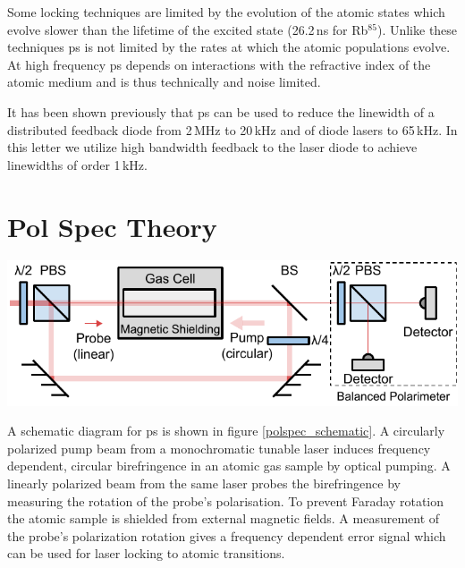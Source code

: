 \documentclass{article}
\newenvironment{Figure}
  {\par\medskip\noindent\minipage{\linewidth}}
  {\endminipage\par\medskip}
\begin{document}
\begin{multicols}{2}
Some locking techniques are limited by the evolution of the atomic states which evolve slower than the lifetime of the excited state (26.2\,ns for Rb$^{85}$). Unlike these techniques \gls*{ps} is not limited by the rates at which the atomic populations evolve. At high frequency \Gls*{ps} depends on interactions with the refractive index of the atomic medium and is thus technically and noise limited.

It has been shown previously that \gls*{ps} can be used to reduce the linewidth of a distributed feedback diode from 2\,MHz to 20\,kHz\cite{torii_laser-phase_2012} and of diode lasers to 65\,kHz\cite{yoshikawa_frequency_2003}. In this letter we utilize high bandwidth feedback to the laser diode to achieve linewidths of order 1\,kHz.

\section{Pol Spec Theory}

\begin{Figure}
    \centering
    \captionsetup{type=figure}
    \includegraphics[width=\linewidth]{Figs/PolSpec.pdf}
    \label{polspec_schematic}
\end{Figure}

A schematic diagram for \gls*{ps}\cite{wieman_doppler-free_1976, demtroder_laser_2014} is shown in figure \ref{polspec_schematic}. A circularly polarized pump beam from a monochromatic tunable laser induces frequency dependent, circular birefringence in an atomic gas sample by optical pumping. A linearly polarized beam from the same laser probes the birefringence by measuring the rotation of the probe's polarisation. To prevent Faraday rotation the atomic sample is shielded from external magnetic fields. A measurement of the probe's polarization rotation gives a frequency dependent error signal which can be used for laser locking to atomic transitions.


\end{multicols}
\end{document}
